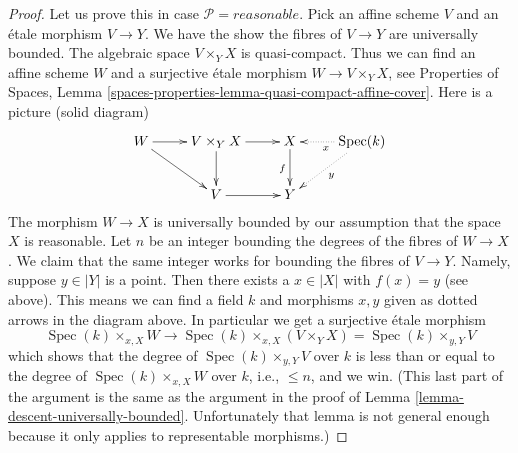 \documentclass{stacks-project}
\theoremstyle{plain}
\theoremstyle{definition}
\theoremstyle{remark}
\numberwithin{equation}{subsection}
\def\Spec{\mathop{\mathrm{Spec}}}
\begin{document}
\begin{proof}
\medskip\noindent
Let us prove this in case $\mathcal{P} = reasonable$.
Pick an affine scheme $V$ and an \'etale morphism $V \to Y$.
We have the show the fibres of $V \to Y$ are universally bounded.
The algebraic space $V \times_Y X$ is quasi-compact.
Thus we can find an affine scheme $W$ and a surjective \'etale morphism
$W \to V \times_Y X$, see
Properties of Spaces,
Lemma \ref{spaces-properties-lemma-quasi-compact-affine-cover}.
Here is a picture (solid diagram)
$$
\xymatrix{
W \ar[r]  \ar[rd] &
V \times_Y X \ar[r] \ar[d] &
X \ar[d]_f & \Spec(k) \ar@{..>}[l]^x \ar@{..>}[ld]^y \\
 & V \ar[r] & Y
}
$$
The morphism $W \to X$ is universally bounded by our assumption that
the space $X$ is reasonable. Let $n$ be an integer bounding
the degrees of the fibres of $W \to X$. We claim that the same integer
works for bounding the fibres of $V \to Y$. Namely, suppose $y \in |Y|$
is a point. Then there exists a $x \in |X|$ with $f(x) = y$ (see above).
This means we can find a field $k$ and morphisms $x, y$ given as dotted
arrows in the diagram above. In particular we get a surjective \'etale
morphism
$$
\Spec(k) \times_{x, X} W
\to
\Spec(k) \times_{x, X} (V \times_Y X) = \Spec(k) \times_{y, Y} V
$$
which shows that the degree of $\Spec(k) \times_{y, Y} V$ over $k$
is less than or equal to the degree of $\Spec(k) \times_{x, X} W$
over $k$, i.e., $\leq n$, and we win. (This last part of the argument
is the same as the argument in the proof of
Lemma \ref{lemma-descent-universally-bounded}.
Unfortunately that lemma is not general enough because it only applies
to representable morphisms.)
\end{proof}
\end{document}
